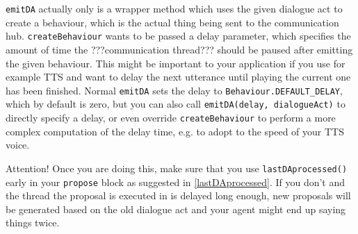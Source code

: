 \texttt{emitDA} actually only is a wrapper method which uses the given dialogue act to create a behaviour, which is the actual thing being sent to the communication hub. \texttt{createBehaviour} wants to be passed a delay parameter, which specifies the amount of time the ???communication thread??? should be paused after emitting the given behaviour. This might be important to your application if you use for example TTS and want to delay the next utterance until playing the current one has been finished.
Normal \texttt{emitDA} sets the delay to \texttt{Behaviour.DEFAULT\_DELAY}, which by default is zero, but you can also call \texttt{emitDA(delay, dialogueAct)} to directly specify a delay, or even override \texttt{createBehaviour} to perform a more complex computation of the delay time, e.g. to adopt to the speed of your TTS voice.

Attention! Once you are doing this, make sure that you use \texttt{lastDAprocessed()} early in your \texttt{propose} block as suggested in \ref{lastDAprocessed}. If you don't and the thread the proposal is executed in is delayed long enough, new proposals will be generated based on the old dialogue act and your agent might end up saying things twice.